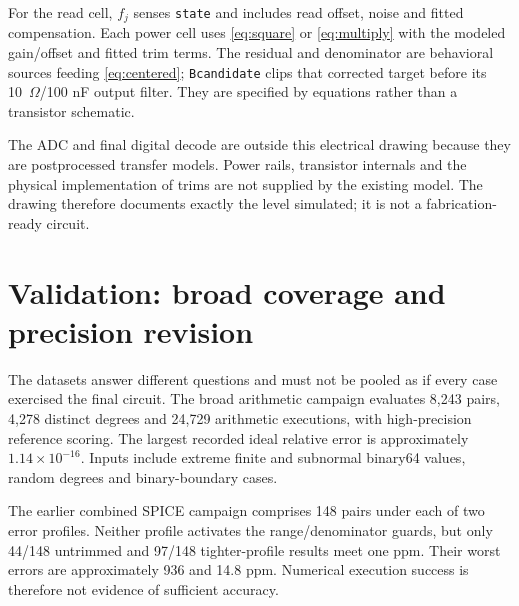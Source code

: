 \documentclass[11pt,a4paper]{article}
\begin{document}
For the read cell, $f_j$ senses \texttt{state} and includes read offset, noise and fitted compensation. Each power cell uses \eqref{eq:square} or \eqref{eq:multiply} with the modeled gain/offset and fitted trim terms. The residual and denominator are behavioral sources feeding \eqref{eq:centered}; \texttt{Bcandidate} clips that corrected target before its 10~$\Omega$/100 nF output filter. They are specified by equations rather than a transistor schematic.

The ADC and final digital decode are outside this electrical drawing because they are postprocessed transfer models. Power rails, transistor internals and the physical implementation of trims are not supplied by the existing model. The drawing therefore documents exactly the level simulated; it is not a fabrication-ready circuit.
\clearpage
\section{Validation: broad coverage and precision revision}
The datasets answer different questions and must not be pooled as if every case exercised the final circuit. The broad arithmetic campaign evaluates 8,243 pairs, 4,278 distinct degrees and 24,729 arithmetic executions, with high-precision reference scoring. The largest recorded ideal relative error is approximately $1.14\times10^{-16}$. Inputs include extreme finite and subnormal binary64 values, random degrees and binary-boundary cases.

The earlier combined SPICE campaign comprises 148 pairs under each of two error profiles. Neither profile activates the range/denominator guards, but only 44/148 untrimmed and 97/148 tighter-profile results meet one ppm. Their worst errors are approximately 936 and 14.8 ppm. Numerical execution success is therefore not evidence of sufficient accuracy.
\end{document}
